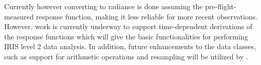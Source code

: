 Currently however converting to radiance is done assuming the pre-flight-measured response function, making it less reliable for more recent observations.
However, work is currently underway to support time-dependent derivations of the response functions which will give  the basic functionalities for performing IRIS level 2 data analysis.
In addition, future enhancements to the  data classes, such as support for arithmetic operations and resampling will be utilized by .



